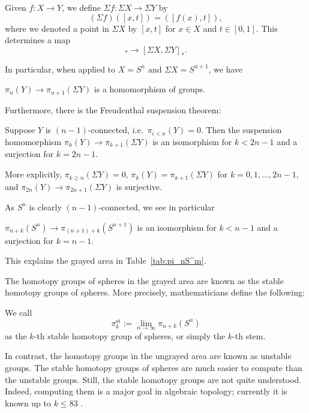 \documentclass[12pt]{article}
\numberwithin{equation}{section}
\theoremstyle{remark}
\begin{document}
\begin{definition}
Given $f:X\to Y$, we define $\Sigma f:\Sigma X\to \Sigma Y$ by \begin{equation}
  (\Sigma f)([x,t]) = ([f(x),t]),
\end{equation}
where we denoted a point in $\Sigma X$ by $[x,t]$ for $x\in X$ and $t\in[0,1]$.
This determines a map \begin{equation}
[X,Y]_*\to [\Sigma X,\Sigma Y]_*.
\end{equation}
\end{definition}

In particular, when applied to $X=S^n$ and $\Sigma X=S^{n+1}$, we have 
\begin{proposition}
$\pi_n(Y)\to \pi_{n+1}(\Sigma Y)$ is a homomorphism of groups.
\end{proposition}
Furthermore, there is the Freudenthal suspension theorem:
\begin{theorem}
Suppose $Y$ is $(n-1)$-connected, i.e.~$\pi_{i<n}(Y)=0$.
Then the suspension homomorphism $\pi_k(Y)\to \pi_{k+1}(\Sigma Y)$ is an isomorphism for $k< 2n-1$ and a surjection for $k=2n-1$.
\end{theorem}
More explicitly, $\pi_{k\ge n}(\Sigma Y)=0$,
$\pi_{k}(Y)=\pi_{k+1}(\Sigma Y)$ for $k=0,1,\ldots,2n-1$,
and $\pi_{2n}(Y)\to \pi_{2n+1}(\Sigma Y)$ is surjective.

As $S^n$ is clearly $(n-1)$-connected, we see in particular 
\begin{proposition}
  $\pi_{n+k}(S^n)\to \pi_{(n+1)+k}(S^{n+1})$ 
  is an isomorphism for $k<n-1$ and a surjection for $k=n-1$.
\end{proposition}
This explains the grayed area in Table~\ref{tab:pi_nS^m}.

The homotopy groups of spheres in the grayed area 
are known as the stable homotopy groups of spheres.
More precisely, mathematicians define the following:
\begin{definition}
  We call \begin{equation}
   \pi^\text{st}_k := \lim_{n\to\infty} \pi_{n+k}(S^n)
  \end{equation}
as the $k$-th stable homotopy group of spheres,
or simply the $k$-th stem.
\end{definition}

In contrast, the homotopy groups in the ungrayed area
are known as unstable groups.
The stable homotopy groups of spheres are much easier to compute than the unstable groups.
Still, the stable homotopy groups are not quite understood.
Indeed, computing them is a major goal in algebraic topology;
currently it is known up to $k\le 83$ \cite{Isaksen}.
\end{document}
